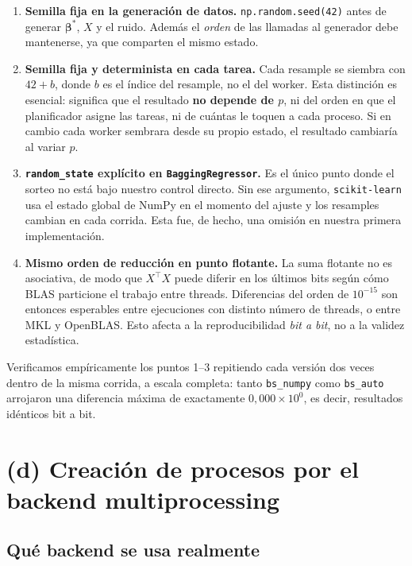 \documentclass[11pt,letterpaper]{article}
\begin{document}
\begin{enumerate}
\item \textbf{Semilla fija en la generación de datos.} \texttt{np.random.seed(42)} antes
  de generar $\boldsymbol{\beta}^*$, $X$ y el ruido. Además el \emph{orden} de las
  llamadas al generador debe mantenerse, ya que comparten el mismo estado.

\item \textbf{Semilla fija y determinista en cada tarea.} Cada resample se siembra con
  $42+b$, donde $b$ es el índice del resample, no el del worker. Esta distinción es
  esencial: significa que el resultado \textbf{no depende de $p$}, ni del orden en que
  el planificador asigne las tareas, ni de cuántas le toquen a cada proceso. Si en
  cambio cada worker sembrara desde su propio estado, el resultado cambiaría al variar
  $p$.

\item \textbf{\texttt{random\_state} explícito en \texttt{BaggingRegressor}.} Es el
  único punto donde el sorteo no está bajo nuestro control directo. Sin ese argumento,
  \texttt{scikit-learn} usa el estado global de NumPy en el momento del ajuste y los
  resamples cambian en cada corrida. Esta fue, de hecho, una omisión en nuestra primera
  implementación.

\item \textbf{Mismo orden de reducción en punto flotante.} La suma flotante no es
  asociativa, de modo que $X^\top X$ puede diferir en los últimos bits según cómo BLAS
  particione el trabajo entre threads. Diferencias del orden de $10^{-15}$ son entonces
  esperables entre ejecuciones con distinto número de threads, o entre MKL y OpenBLAS.
  Esto afecta a la reproducibilidad \emph{bit a bit}, no a la validez estadística.
\end{enumerate}

Verificamos empíricamente los puntos 1--3 repitiendo cada versión dos veces dentro de
la misma corrida, a escala completa: tanto \texttt{bs\_numpy} como \texttt{bs\_auto}
arrojaron una diferencia máxima de exactamente $0{,}000 \times 10^{0}$, es decir,
resultados idénticos bit a bit.

\section{(d) Creación de procesos por el backend multiprocessing}
\label{sec:d}

\subsection{Qué backend se usa realmente}
\end{document}
